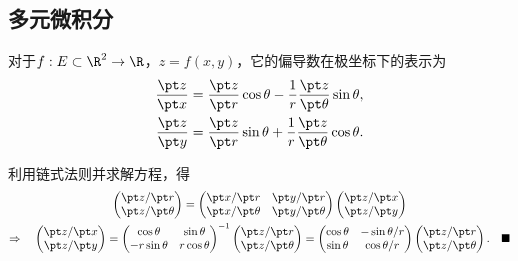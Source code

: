\subsection{多元微积分}

  \begin{thm}[偏导数的极坐标表示]
    \label{thm: 偏导数的极坐标表示}
    对于$f:E\subset\R^2\to\R$，$z=f(x,y)$，它的偏导数在极坐标下的表示为
    \[\begin{split}
      \frac{\pt z}{\pt x} &= \frac{\pt z}{\pt r}\cos\theta
        - \frac{1}{r}\frac{\pt z}{\pt\theta}\sin\theta,\\
      \frac{\pt z}{\pt y} &= \frac{\pt z}{\pt r}\sin\theta
       + \frac{1}{r}\frac{\pt z}{\pt\theta}\cos\theta.
    \end{split}\]
  \end{thm}
  \proof
    利用链式法则并求解方程，得
    \begin{gather*}
      \begin{pmatrix}
        \pt z/\pt r \\ \pt z/\pt \theta
      \end{pmatrix} =
      \begin{pmatrix}
        \pt x/\pt r & \pt y/\pt r \\
        \pt x/\pt \theta & \pt y/\pt\theta
      \end{pmatrix}
      \begin{pmatrix}
        \pt z/\pt x \\ \pt z/\pt y
      \end{pmatrix} \\
      \Rightarrow\quad
      \begin{pmatrix}
        \pt z/\pt x \\ \pt z/\pt y
      \end{pmatrix} =
      \begin{pmatrix}
        \cos\theta & \sin\theta \\
        -r\sin\theta & r\cos\theta
      \end{pmatrix}^{-1}
      \begin{pmatrix}
        \pt z/\pt r \\ \pt z/\pt \theta
      \end{pmatrix}=
      \begin{pmatrix}
        \cos\theta & -\sin\theta / r \\
        \sin\theta & \cos\theta / r
      \end{pmatrix}
      \begin{pmatrix}
        \pt z/\pt r \\ \pt z/\pt \theta
      \end{pmatrix}.\quad\blacksquare
    \end{gather*}

